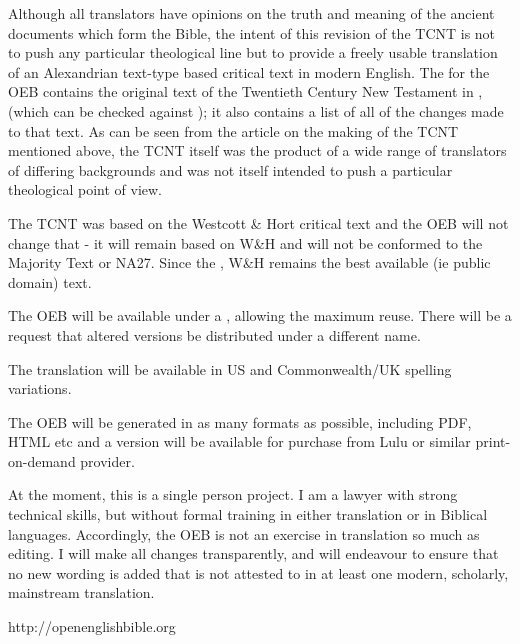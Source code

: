 Although all translators have opinions on the truth and meaning of
the ancient documents which form the Bible, the intent of this
revision of the TCNT is not to push any particular theological line
but to provide a freely usable translation of an Alexandrian
text-type based critical text in modern English. The
\from[1] for the OEB contains the
original text of the Twentieth Century New Testament in
\from[2], (which can be
checked against
\from[3]);
it also contains a list of all of the changes made to that text. As
can be seen from the article on the making of the TCNT mentioned
above, the TCNT itself was the product of a wide range of
translators of differing backgrounds and was not itself intended to
push a particular theological point of view.


The TCNT was based on the Westcott \& Hort critical text and the
OEB will not change that - it will remain based on W\&H and will
not be conformed to the Majority Text or NA27. Since the
\from[4],
W\&H remains the best available (ie public domain) text.


The OEB will be available under a
\from[5],
allowing the maximum reuse. There will be a request that altered
versions be distributed under a different name.


The translation will be available in US and Commonwealth/UK
spelling variations.


The OEB will be generated in as many formats as possible, including
PDF, HTML etc and a version will be available for purchase from
Lulu or similar print-on-demand provider.


At the moment, this is a single person project. I am a lawyer with
strong technical skills, but without formal training in either
translation or in Biblical languages. Accordingly, the OEB is not
an exercise in translation so much as editing. I will make all
changes transparently, and will endeavour to ensure that no new
wording is added that is not attested to in at least one modern,
scholarly, mainstream translation.


http://openenglishbible.org

\marking[RAChapter]{ } \marking[RABook]{ } \marking[RASection]{ }